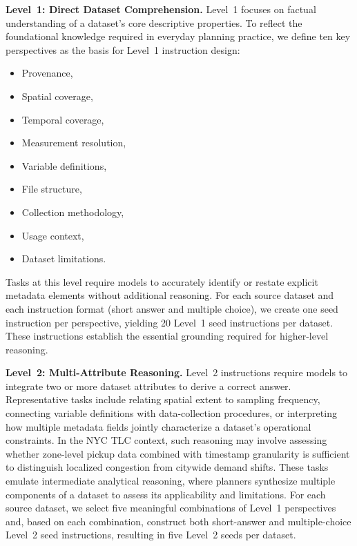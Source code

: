 \documentclass[a4paper,fleqn]{cas-sc}
\begin{document}
\textbf{Level~1: Direct Dataset Comprehension.}
Level~1 focuses on factual understanding of a dataset’s core descriptive properties. To reflect the foundational knowledge required in everyday planning practice, we define ten key perspectives as the basis for Level~1 instruction design:
\begin{itemize}
\item Provenance,
\item Spatial coverage,
\item Temporal coverage,
\item Measurement resolution,
\item Variable definitions,
\item File structure,
\item Collection methodology,
\item Usage context,
\item Dataset limitations.
\end{itemize}
Tasks at this level require models to accurately identify or restate explicit metadata elements without additional reasoning. For each source dataset and each instruction format (short answer and multiple choice), we create one seed instruction per perspective, yielding 20 Level~1 seed instructions per dataset. These instructions establish the essential grounding required for higher-level reasoning.

\textbf{Level~2: Multi-Attribute Reasoning.}
Level~2 instructions require models to integrate two or more dataset attributes to derive a correct answer. Representative tasks include relating spatial extent to sampling frequency, connecting variable definitions with data-collection procedures, or interpreting how multiple metadata fields jointly characterize a dataset’s operational constraints. In the NYC TLC context, such reasoning may involve assessing whether zone-level pickup data combined with timestamp granularity is sufficient to distinguish localized congestion from citywide demand shifts. These tasks emulate intermediate analytical reasoning, where planners synthesize multiple components of a dataset to assess its applicability and limitations. For each source dataset, we select five meaningful combinations of Level~1 perspectives and, based on each combination, construct both short-answer and multiple-choice Level~2 seed instructions, resulting in five Level~2 seeds per dataset.
\end{document}
